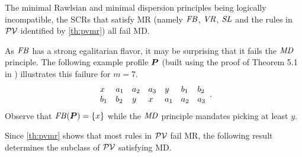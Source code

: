 \documentclass[version=3.21, pagesize, twoside=off, bibliography=totoc, DIV=calc, fontsize=12pt, a4paper]{scrartcl}
\begin{document}
The minimal Rawlsian and minimal dispersion principles being logically incompatible, the SCRs that satisfy MR (namely $\mathit{FB}$, $\mathit{VR}$, $\mathit{SL}$ and the rules in $\mathcal{PV}$ identified by \cref{th:pvmr}) all fail MD. 

\begin{remark}
	As $\mathit{FB}$ has a strong egalitarian flavor, it may be surprising that it fails the $\mathit{MD}$ principle. The following example profile $\bm{P}$ (built using the proof of Theorem 5.1 in \citet{cailloux2022compromising}) illustrates this failure for $m = 7$.
	\begin{equation}
		\begin{array}{*7{l}}
			x& a_1 & a_2 & a_3 & y & b_1 & b_2\\
			b_1& b_2 & y & x & a_1 & a_2 & a_3\\
		\end{array}.
	\end{equation}
	Observe that $\mathit{FB}(\bm{P}) = \{x\}$ while the $\mathit{MD}$ principle mandates picking at least $y$.
\end{remark}

Since \cref{th:pvmr} shows that most rules in $\mathcal{PV}$ fail MR, the following result determines the subclass of $\mathcal{PV}$ satisfying MD. 
\end{document}
